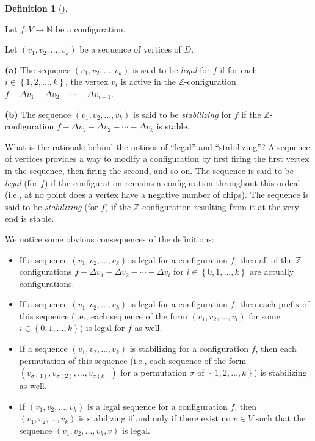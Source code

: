 \documentclass[numbers=enddot,12pt,final,onecolumn,notitlepage]{scrartcl}%
\theoremstyle{definition}
\newtheorem{defi}[theo]{Definition}
\newenvironment{definition}[1][]
{\begin{defi}[#1]\begin{leftbar}}
{\end{leftbar}\end{defi}}
\newcommand{\NN}{\mathbb{N}}
\newcommand{\ZZ}{\mathbb{Z}}
\newcommand{\set}[1]{\left\{ #1 \right\}}
\newcommand{\tup}[1]{\left( #1 \right)}
\begin{document}
\begin{definition}
Let $f : V \to \NN$ be a configuration.

Let $\tup{v_1, v_2, \ldots, v_k}$ be a sequence of vertices of
$D$.

\textbf{(a)} The sequence $\tup{v_1, v_2, \ldots, v_k}$ is said
to be \textit{legal} for $f$ if for each
$i \in \set{1, 2, \ldots, k}$, the vertex $v_i$ is active in
the $\ZZ$-configuration
$f - \Delta v_1 - \Delta v_2 - \cdots - \Delta v_{i-1}$.

\textbf{(b)} The sequence $\tup{v_1, v_2, \ldots, v_k}$ is said
to be \textit{stabilizing} for $f$ if the $\ZZ$-configuration
$f - \Delta v_1 - \Delta v_2 - \cdots - \Delta v_k$ is stable.
\end{definition}

What is the rationale behind the notions of ``legal'' and
``stabilizing''?
A sequence of vertices provides a way to modify a
configuration by first firing the first vertex in the sequence,
then firing the second, and so on.
The sequence is said to be \textit{legal} (for $f$) if the
configuration remains a configuration throughout this ordeal
(i.e., at no point does a vertex have a negative number of
chips).
The sequence is said to be \textit{stabilizing} (for $f$) if
the $\ZZ$-configuration resulting from it at the very end is
stable.

We notice some obvious consequences of the definitions:

\begin{itemize}
 \item If a sequence $\tup{v_1, v_2, \ldots, v_k}$ is legal
       for a configuration $f$, then all of the
       $\ZZ$-configurations
       $f - \Delta v_1 - \Delta v_2 - \cdots - \Delta v_i$
       for $i \in \set{0, 1, \ldots, k}$ are actually
       configurations.
 \item If a sequence $\tup{v_1, v_2, \ldots, v_k}$ is legal
       for a configuration $f$, then each prefix of this
       sequence (i.e., each sequence of the form
       $\tup{v_1, v_2, \ldots, v_i}$ for some
       $i \in \set{0, 1, \ldots, k}$) is legal for $f$ as
       well.
 \item If a sequence $\tup{v_1, v_2, \ldots, v_k}$ is
       stabilizing for a configuration $f$, then each
       permutation of this sequence (i.e., each sequence of
       the form
       $\tup{v_{\sigma\tup{1}}, v_{\sigma\tup{2}}, \ldots,
             v_{\sigma\tup{k}}}$ for a permutation
       $\sigma$ of $\set{1, 2, \ldots, k}$) is stabilizing
       as well.
 \item If $\tup{v_1, v_2, \ldots, v_k}$ is a legal sequence
       for a configuration $f$, then
       $\tup{v_1, v_2, \ldots, v_k}$ is stabilizing if and
       only if there exist no $v \in V$ such that the
       sequence $\tup{v_1, v_2, \ldots, v_k, v}$ is legal.
\end{itemize}
\end{document}
